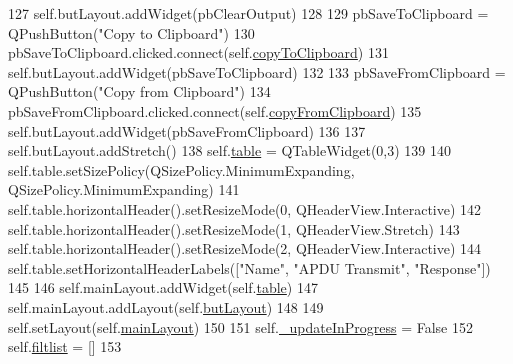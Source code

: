 \begin{DoxyCode}
127         self.butLayout.addWidget(pbClearOutput)
128         
129         pbSaveToClipboard = QPushButton(\textcolor{stringliteral}{"Copy to Clipboard"})
130         pbSaveToClipboard.clicked.connect(self.\hyperlink{classsoftware_1_1chipwhisperer_1_1capture_1_1targets_1_1__smartcard__gui_1_1SmartCardGUICard_ae9a4a165796832cab0aa2c4593fc1bbe}{copyToClipboard})
131         self.butLayout.addWidget(pbSaveToClipboard)
132         
133         pbSaveFromClipboard = QPushButton(\textcolor{stringliteral}{"Copy from Clipboard"})
134         pbSaveFromClipboard.clicked.connect(self.\hyperlink{classsoftware_1_1chipwhisperer_1_1capture_1_1targets_1_1__smartcard__gui_1_1SmartCardGUICard_a8eedbb4976c4d96644d3c2652f0dcdc2}{copyFromClipboard})
135         self.butLayout.addWidget(pbSaveFromClipboard)
136         
137         self.butLayout.addStretch()
138         self.\hyperlink{classsoftware_1_1chipwhisperer_1_1capture_1_1targets_1_1__smartcard__gui_1_1SmartCardGUICard_a7b880ab37bcf33449742c93207300994}{table} = QTableWidget(0,3)
139         
140         self.table.setSizePolicy(QSizePolicy.MinimumExpanding, QSizePolicy.MinimumExpanding)
141         self.table.horizontalHeader().setResizeMode(0, QHeaderView.Interactive) 
142         self.table.horizontalHeader().setResizeMode(1, QHeaderView.Stretch) 
143         self.table.horizontalHeader().setResizeMode(2, QHeaderView.Interactive) 
144         self.table.setHorizontalHeaderLabels([\textcolor{stringliteral}{"Name"}, \textcolor{stringliteral}{"APDU Transmit"}, \textcolor{stringliteral}{"Response"}])
145         
146         self.mainLayout.addWidget(self.\hyperlink{classsoftware_1_1chipwhisperer_1_1capture_1_1targets_1_1__smartcard__gui_1_1SmartCardGUICard_a7b880ab37bcf33449742c93207300994}{table})
147         self.mainLayout.addLayout(self.\hyperlink{classsoftware_1_1chipwhisperer_1_1capture_1_1targets_1_1__smartcard__gui_1_1SmartCardGUICard_aa5e6d7eb55be749244108811ec5c2445}{butLayout})
148 
149         self.setLayout(self.\hyperlink{classsoftware_1_1chipwhisperer_1_1capture_1_1targets_1_1__smartcard__gui_1_1SmartCardGUICard_a38289fa3967d2704d23c215623b9be3a}{mainLayout})
150         
151         self.\hyperlink{classsoftware_1_1chipwhisperer_1_1capture_1_1targets_1_1__smartcard__gui_1_1SmartCardGUICard_ac04f829d56a48b943ebeff863bf245f8}{\_updateInProgress} = \textcolor{keyword}{False}
152         self.\hyperlink{classsoftware_1_1chipwhisperer_1_1capture_1_1targets_1_1__smartcard__gui_1_1SmartCardGUICard_a66117a90b2caaf1a0cdcc6026bfc414e}{filtlist} = []
153                
\end{DoxyCode}



